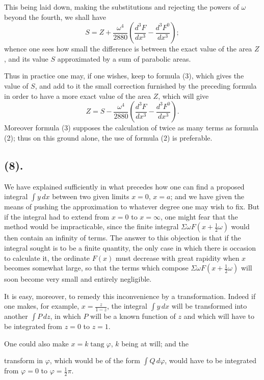 \documentclass{article}
\begin{document}
This being laid down, making the substitutions and rejecting the powers of $\omega$ beyond the fourth, we shall have
\[ S=Z+\frac{\omega^{4}}{2880}\left(\frac{d^{3}F}{dx^{3}}-\frac{d^{3}F^{0}}{dx^{3}}\right); \]
whence one sees how small the difference is between the exact value of the area $Z$, and its value $S$ approximated by a sum of parabolic areas.

Thus in practice one may, if one wishes, keep to formula (3), which gives the value of $S$, and add to it the small correction furnished by the preceding formula in order to have a more exact value of the area $Z$, which will give
\[ Z=S-\frac{\omega^{4}}{2880}\left(\frac{d^{3}F}{dx^{3}}-\frac{d^{3}F^{0}}{dx^{3}}\right). \]
Moreover formula (3) supposes the calculation of twice as many terms as formula (2); thus on this ground alone, the use of formula (2) is preferable.

\subsection*{(8).}

We have explained sufficiently in what precedes how one can find a proposed integral $\displaystyle\int y\,dx$ between two given limits $x=0$, $x=a$; and we have given the means of pushing the approximation to whatever degree one may wish to fix. But if the integral had to extend from $x=0$ to $x=\infty$, one might fear that the method would be impracticable, since the finite integral $\Sigma\omega F(x+\frac{1}{2}\omega)$ would then contain an infinity of terms. The answer to this objection is that if the integral sought is to be a finite quantity, the only case in which there is occasion to calculate it, the ordinate $F(x)$ must decrease with great rapidity when $x$ becomes somewhat large, so that the terms which compose $\Sigma\omega F(x+\frac{1}{2}\omega)$ will soon become very small and entirely negligible.

It is easy, moreover, to remedy this inconvenience by a transformation. Indeed if one makes, for example, $x=\frac{z}{1-z}$, the integral $\displaystyle\int y\,dx$ will be transformed into another $\displaystyle\int P\,dz$, in which $P$ will be a known function of $z$ and which will have to be integrated from $z=0$ to $z=1$.

One could also make $x=k\operatorname{tang}\varphi$, $k$ being at will; and the

transform in $\varphi$, which would be of the form $\displaystyle\int Q\,d\varphi$, would have to be integrated from $\varphi=0$ to $\varphi=\frac{1}{2}\pi$.
\end{document}
